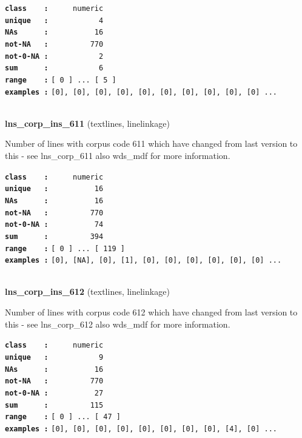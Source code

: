 \documentclass[]{article}
\begin{document}
\textbf{\texttt{class\ \ \ \ :}} \texttt{~~~~~numeric}\\
\textbf{\texttt{unique\ \ \ :}} \texttt{~~~~~~~~~~~4}\\
\textbf{\texttt{NAs\ \ \ \ \ \ :}} \texttt{~~~~~~~~~~16}\\
\textbf{\texttt{not-NA\ \ \ :}} \texttt{~~~~~~~~~770}\\
\textbf{\texttt{not-0-NA\ :}} \texttt{~~~~~~~~~~~2}\\
\textbf{\texttt{sum\ \ \ \ \ \ :}} \texttt{~~~~~~~~~~~6}\\
\textbf{\texttt{range\ \ \ \ :}}
\texttt{{[}\ 0\ {]}\ ...\ {[}\ 5\ {]}}\\
\textbf{\texttt{examples\ :}}
\texttt{{[}0{]},\ {[}0{]},\ {[}0{]},\ {[}0{]},\ {[}0{]},\ {[}0{]},\ {[}0{]},\ {[}0{]},\ {[}0{]},\ {[}0{]}\ ...}\\

~

\textbf{lns\_corp\_ins\_611} (textlines, linelinkage)

Number of lines with corpus code 611 which have changed from last
version to this - see lns\_corp\_611 also wds\_mdf for more information.

\textbf{\texttt{class\ \ \ \ :}} \texttt{~~~~~numeric}\\
\textbf{\texttt{unique\ \ \ :}} \texttt{~~~~~~~~~~16}\\
\textbf{\texttt{NAs\ \ \ \ \ \ :}} \texttt{~~~~~~~~~~16}\\
\textbf{\texttt{not-NA\ \ \ :}} \texttt{~~~~~~~~~770}\\
\textbf{\texttt{not-0-NA\ :}} \texttt{~~~~~~~~~~74}\\
\textbf{\texttt{sum\ \ \ \ \ \ :}} \texttt{~~~~~~~~~394}\\
\textbf{\texttt{range\ \ \ \ :}}
\texttt{{[}\ 0\ {]}\ ...\ {[}\ 119\ {]}}\\
\textbf{\texttt{examples\ :}}
\texttt{{[}0{]},\ {[}NA{]},\ {[}0{]},\ {[}1{]},\ {[}0{]},\ {[}0{]},\ {[}0{]},\ {[}0{]},\ {[}0{]},\ {[}0{]}\ ...}\\

~

\textbf{lns\_corp\_ins\_612} (textlines, linelinkage)

Number of lines with corpus code 612 which have changed from last
version to this - see lns\_corp\_612 also wds\_mdf for more information.

\textbf{\texttt{class\ \ \ \ :}} \texttt{~~~~~numeric}\\
\textbf{\texttt{unique\ \ \ :}} \texttt{~~~~~~~~~~~9}\\
\textbf{\texttt{NAs\ \ \ \ \ \ :}} \texttt{~~~~~~~~~~16}\\
\textbf{\texttt{not-NA\ \ \ :}} \texttt{~~~~~~~~~770}\\
\textbf{\texttt{not-0-NA\ :}} \texttt{~~~~~~~~~~27}\\
\textbf{\texttt{sum\ \ \ \ \ \ :}} \texttt{~~~~~~~~~115}\\
\textbf{\texttt{range\ \ \ \ :}}
\texttt{{[}\ 0\ {]}\ ...\ {[}\ 47\ {]}}\\
\textbf{\texttt{examples\ :}}
\texttt{{[}0{]},\ {[}0{]},\ {[}0{]},\ {[}0{]},\ {[}0{]},\ {[}0{]},\ {[}0{]},\ {[}0{]},\ {[}4{]},\ {[}0{]}\ ...}\\
\end{document}
